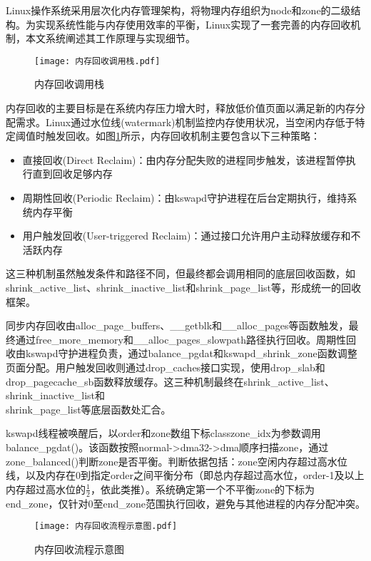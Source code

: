 Linux操作系统采用层次化内存管理架构，将物理内存组织为node和zone的二级结构。为实现系统性能与内存使用效率的平衡，Linux实现了一套完善的内存回收机制，本文系统阐述其工作原理与实现细节。

\begin{figure}[htb]
    \centering
    \texttt{[image: 内存回收调用栈.pdf]}
    \caption{内存回收调用栈}
    \label{fig:memory_reclaim_callgraph}
\end{figure}

内存回收的主要目标是在系统内存压力增大时，释放低价值页面以满足新的内存分配需求。Linux通过水位线(watermark)机制监控内存使用状况，当空闲内存低于特定阈值时触发回收。如图\ref{fig:memory_reclaim_callgraph}所示，内存回收机制主要包含以下三种策略：

\begin{itemize}
    \item 直接回收(Direct Reclaim)：由内存分配失败的进程同步触发，该进程暂停执行直到回收足够内存
    \item 周期性回收(Periodic Reclaim)：由kswapd守护进程在后台定期执行，维持系统内存平衡
    \item 用户触发回收(User-triggered Reclaim)：通过接口允许用户主动释放缓存和不活跃内存
\end{itemize}

这三种机制虽然触发条件和路径不同，但最终都会调用相同的底层回收函数，如shrink\_active\_list、shrink\_inactive\_list和shrink\_page\_list等，形成统一的回收框架。

同步内存回收由alloc\_page\_buffers、\_\_getblk和\_\_alloc\_pages等函数触发，最终通过free\_more\_memory和\_\_alloc\_pages\_slowpath路径执行回收。周期性回收由kswapd守护进程负责，通过balance\_pgdat和kswapd\_shrink\_zone函数调整页面分配。用户触发回收则通过drop\_caches接口实现，使用drop\_slab和drop\_pagecache\_sb函数释放缓存。这三种机制最终在shrink\_active\_list、shrink\_inactive\_list和\\shrink\_page\_list等底层函数处汇合。

kswapd线程被唤醒后，以order和zone数组下标classzone\_idx为参数调用balance\_pgdat()。该函数按照normal->dma32->dma顺序扫描zone，通过zone\_balanced()判断zone是否平衡。判断依据包括：zone空闲内存超过高水位线，以及内存在0到指定order之间平衡分布（即总内存超过高水位，order-1及以上内存超过高水位的\(\frac{1}{2}\)，依此类推）。系统确定第一个不平衡zone的下标为end\_zone，仅针对0至end\_zone范围执行回收，避免与其他进程的内存分配冲突。

\begin{figure}[htb]
    \centering
    \texttt{[image: 内存回收流程示意图.pdf]}
    \caption{内存回收流程示意图}
    \label{fig:memory_reclaim_mechanism}
\end{figure}

